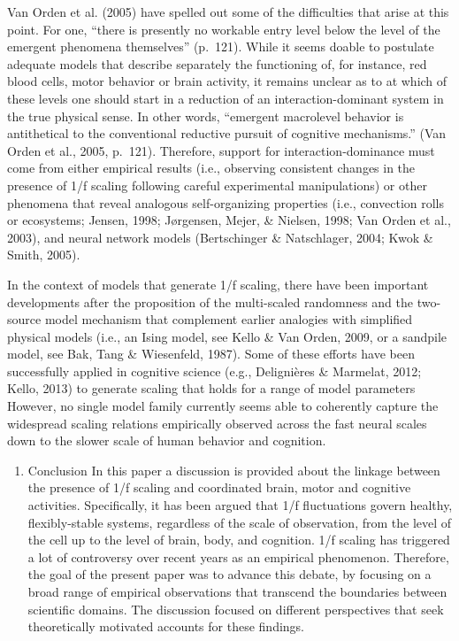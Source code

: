 \documentclass[12pt,]{book}
\providecommand{\tightlist}{%
  \setlength{\itemsep}{0pt}\setlength{\parskip}{0pt}}
\begin{document}
Van Orden et al. (2005) have spelled out some of the difficulties that arise at this point. For one, ``there is presently no workable entry level below the level of the emergent phenomena themselves'' (p.~121). While it seems doable to postulate adequate models that describe separately the functioning of, for instance, red blood cells, motor behavior or brain activity, it remains unclear as to at which of these levels one should start in a reduction of an interaction-dominant system in the true physical sense. In other words, ``emergent macrolevel behavior is antithetical to the conventional reductive pursuit of cognitive mechanisms.'' (Van Orden et al., 2005, p.~121). Therefore, support for interaction-dominance must come from either empirical results (i.e., observing consistent changes in the presence of 1/f scaling following careful experimental manipulations) or other phenomena that reveal analogous self-organizing properties (i.e., convection rolls or ecosystems; Jensen, 1998; Jørgensen, Mejer, \& Nielsen, 1998; Van Orden et al., 2003), and neural network models (Bertschinger \& Natschlager, 2004; Kwok \& Smith, 2005).

In the context of models that generate 1/f scaling, there have been important developments after the proposition of the multi-scaled randomness and the two-source model mechanism that complement earlier analogies with simplified physical models (i.e., an Ising model, see Kello \& Van Orden, 2009, or a sandpile model, see Bak, Tang \& Wiesenfeld, 1987). Some of these efforts have been successfully applied in cognitive science (e.g., Delignières \& Marmelat, 2012; Kello, 2013) to generate scaling that holds for a range of model parameters However, no single model family currently seems able to coherently capture the widespread scaling relations empirically observed across the fast neural scales down to the slower scale of human behavior and cognition.

\begin{enumerate}
\def\labelenumi{\arabic{enumi}.}
\setcounter{enumi}{2}
\tightlist
\item
  Conclusion
  In this paper a discussion is provided about the linkage between the presence of 1/f scaling and coordinated brain, motor and cognitive activities. Specifically, it has been argued that 1/f fluctuations govern healthy, flexibly-stable systems, regardless of the scale of observation, from the level of the cell up to the level of brain, body, and cognition. 1/f scaling has triggered a lot of controversy over recent years as an empirical phenomenon. Therefore, the goal of the present paper was to advance this debate, by focusing on a broad range of empirical observations that transcend the boundaries between scientific domains. The discussion focused on different perspectives that seek theoretically motivated accounts for these findings.
\end{enumerate}
\end{document}
